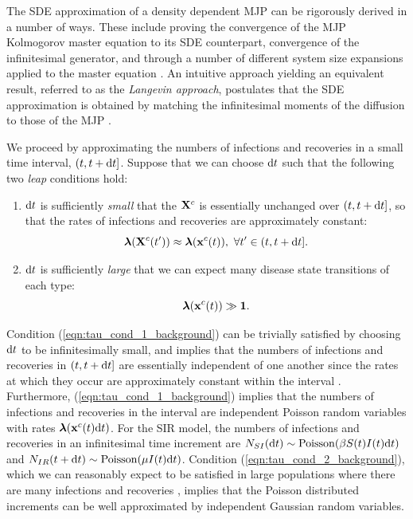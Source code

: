 {The SDE approximation of a density dependent MJP can be rigorously derived in a number of ways. These include proving the convergence of the MJP Kolmogorov master equation to its SDE counterpart, convergence of the infinitesimal generator, and through a number of different system size expansions applied to the master equation \cite{fuchs2013inference}. An intuitive approach yielding an equivalent result, referred to as the \textit{Langevin approach}, postulates that the SDE approximation is obtained by matching the infinitesimal moments of the diffusion to those of the MJP \cite{fuchs2013inference,gillespie2000chemical,wallace2012linear}. 

We proceed by approximating the numbers of infections and recoveries in a small time interval, $ (t, t+\mathrm{d} t] $. Suppose that we can choose $ \mathrm{d} t $ such that the following two \textit{leap} conditions hold:
\begin{enumerate}
	\item $ \mathrm{d} t $ is sufficiently \textit{small} that the $ \mathbf{X}^c $ is essentially unchanged over $ (t,t+\mathrm{d} t] $, so that the rates of infections and recoveries are approximately constant: 
	\begin{equation}\label{eqn:tau_cond_1_background}
	\boldsymbol{\lambda}(\mathbf{X}^c(t^\prime)) \approx \boldsymbol{\lambda}(\mathbf{x}^c(t)),\ \forall t^\prime \in (t,t+\mathrm{d} t].
	\end{equation}
	\item $ \mathrm{d} t $ is sufficiently \textit{large} that we can expect many disease state transitions of each type:
	\begin{equation}\label{eqn:tau_cond_2_backgroun}
	\boldsymbol{\lambda}(\mathbf{x}^c(t)) \gg \boldsymbol{1}.
	\end{equation}
\end{enumerate}
Condition (\ref{eqn:tau_cond_1_background}) can be trivially satisfied by choosing $ \mathrm{d} t $ to be infinitesimally small, and implies that the numbers of infections and recoveries in $ (t,t+\mathrm{d} t] $ are essentially independent of one another since the rates at which they occur are approximately constant within the interval \cite{gillespie2000chemical}. Furthermore, (\ref{eqn:tau_cond_1_background}) implies that the numbers of infections and recoveries in the interval are independent Poisson random variables with rates $ \boldsymbol{\lambda}(\mathbf{x}^c(t)\mathrm{d} t) $. For the SIR model, the numbers of infections and recoveries in an infinitesimal time increment are $ N_{SI}(\mathrm{d} t) \sim \mathrm{Poisson}(\beta S(t)I(t)\mathrm{d} t) $ and $ N_{IR}(t+\mathrm{d} t) \sim \mathrm{Poisson}(\mu I(t)\mathrm{d} t) $. Condition (\ref{eqn:tau_cond_2_background}), which we can reasonably expect to be satisfied in large populations where there are many infections and recoveries \cite{wallace2012linear}, implies that the Poisson distributed increments can be well approximated by independent Gaussian random variables. 

}
